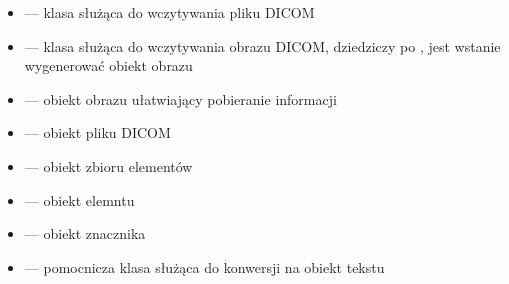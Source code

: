 \gdcmclassExplanations

\begin{itemize}
    \item {} --- klasa służąca do wczytywania pliku DICOM
    \item {} --- klasa służąca do wczytywania obrazu DICOM, dziedziczy po , jest wstanie wygenerować obiekt obrazu
    \item {} --- obiekt obrazu ułatwiający pobieranie informacji
    \item {} --- obiekt pliku DICOM
    \item {} --- obiekt zbioru elementów
    \item {} --- obiekt elemntu
    \item {} --- obiekt znacznika
    \item {} --- pomocnicza klasa służąca do konwersji na obiekt tekstu
\end{itemize}